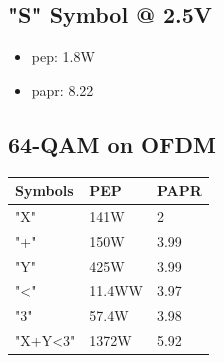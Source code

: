 \documentclass[a4paper]{article}
\begin{document}
\subsection*{"S" Symbol @ 2.5V}
\begin{itemize}
    \item \gls{pep}: 1.8W
    \item \gls{papr}: 8.22
\end{itemize}

\subsection{64-QAM on OFDM}
\begin{tabular}{|l|l|l|}
\hline
\textbf{Symbols} & \textbf{PEP} & \textbf{PAPR} \\ \hline
"X" & 141W & 2 \\ \hline
"+" & 150W & 3.99 \\ \hline
"Y" & 425W & 3.99 \\ \hline
"<" & 11.4WW & 3.97 \\ \hline
"3" & 57.4W & 3.98 \\ \hline
"X+Y<3" & 1372W & 5.92 \\ \hline
\end{tabular}
\end{document}
